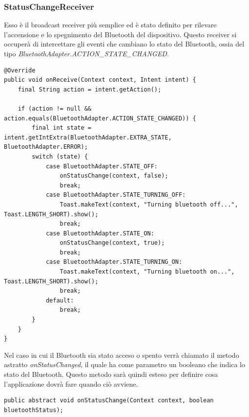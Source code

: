 \subsubsection{StatusChangeReceiver}
Esso è il broadcast receiver più semplice ed è stato definito per rilevare l'accensione e lo spegnimento del Bluetooth del dispositivo. Questo receiver si occuperà di intercettare gli eventi che cambiano lo stato del Bluetooth, ossia del tipo \textit{BluetoothAdapter.ACTION\_STATE\_CHANGED}.
\begin{verbatim}
@Override
public void onReceive(Context context, Intent intent) {
    final String action = intent.getAction();

    if (action != null && action.equals(BluetoothAdapter.ACTION_STATE_CHANGED)) {
        final int state = intent.getIntExtra(BluetoothAdapter.EXTRA_STATE, BluetoothAdapter.ERROR);
        switch (state) {
            case BluetoothAdapter.STATE_OFF:
                onStatusChange(context, false);
                break;
            case BluetoothAdapter.STATE_TURNING_OFF:
                Toast.makeText(context, "Turning bluetooth off...", Toast.LENGTH_SHORT).show();
                break;
            case BluetoothAdapter.STATE_ON:
                onStatusChange(context, true);
                break;
            case BluetoothAdapter.STATE_TURNING_ON:
                Toast.makeText(context, "Turning bluetooth on...", Toast.LENGTH_SHORT).show();
                break;
            default:
                break;
        }
    }
}
\end{verbatim}

Nel caso in cui il Bluetooth sia stato acceso o spento verrà chiamato il metodo astratto \textit{onStatusChanged}, il quale ha come parametro un booleano che indica lo stato del Bluetooth. Questo metodo sarà quindi esteso per definire cosa l'applicazione dovrà fare quando ciò avviene.
\begin{verbatim}
public abstract void onStatusChange(Context context, boolean bluetoothStatus);
\end{verbatim}

